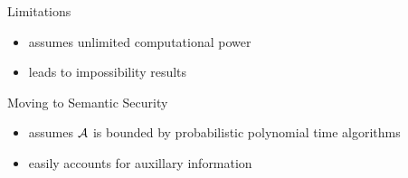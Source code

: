 Limitations
\begin{itemize}
    \item assumes unlimited computational power
    \item leads to impossibility results 
\end{itemize}

Moving to Semantic Security
\begin{itemize}
    \item assumes ${\cal A}$ is bounded by probabilistic polynomial time algorithms
    \item easily accounts for auxillary information
\end{itemize}